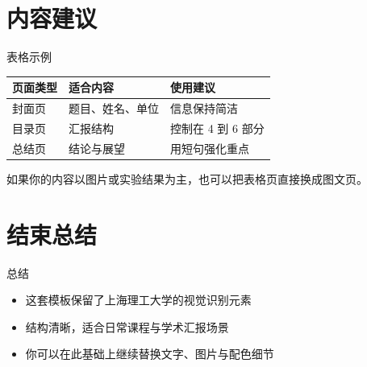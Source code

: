 \documentclass[aspectratio=169]{beamer}
\begin{document}
\section{内容建议}
\begin{frame}{表格示例}
\small
\begin{tabular}{>{\raggedright\arraybackslash}p{}>{\raggedright\arraybackslash}p{}>{\raggedright\arraybackslash}p{}}
\toprule
\textbf{页面类型} & \textbf{适合内容} & \textbf{使用建议}\\
\midrule
封面页 & 题目、姓名、单位 & 信息保持简洁\\
目录页 & 汇报结构 & 控制在 4 到 6 部分\\
总结页 & 结论与展望 & 用短句强化重点\\
\bottomrule
\end{tabular}

\vspace{0.35cm}
\large
如果你的内容以图片或实验结果为主，也可以把表格页直接换成图文页。
\end{frame}

\section{结束总结}
\begin{frame}{总结}
\large
\begin{itemize}
  \item 这套模板保留了上海理工大学的视觉识别元素
  \item 结构清晰，适合日常课程与学术汇报场景
  \item 你可以在此基础上继续替换文字、图片与配色细节
\end{itemize}
\end{frame}

\usstthanksframe
\end{document}
